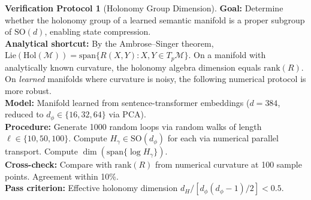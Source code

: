 \documentclass[11pt,a4paper]{article}
\theoremstyle{definition}
\newtheorem{protocol}[theorem]{Verification Protocol}
\theoremstyle{remark}
\newcommand{\SO}{\mathrm{SO}}
\newcommand{\Hol}{\mathrm{Hol}}
\begin{document}
\begin{protocol}[Holonomy Group Dimension]\label{prot:holonomy_dim}
\textbf{Goal:} Determine whether the holonomy group of a learned 
semantic manifold is a proper subgroup of $\SO(d)$, enabling 
state compression. \\
\textbf{Analytical shortcut:} By the Ambrose--Singer theorem, 
$\mathrm{Lie}(\Hol(\mathcal{M})) = \mathrm{span}\{R(X,Y) : 
X, Y \in T_p\mathcal{M}\}$. On a manifold with analytically 
known curvature, the holonomy algebra dimension equals 
$\mathrm{rank}(R)$. On \emph{learned} manifolds where curvature 
is noisy, the following numerical protocol is more robust. \\
\textbf{Model:} Manifold learned from sentence-transformer 
embeddings ($d = 384$, reduced to $d_\phi \in \{16, 32, 64\}$ 
via PCA). \\
\textbf{Procedure:} Generate 1000 random loops via random walks 
of length $\ell \in \{10, 50, 100\}$. Compute 
$H_\gamma \in \SO(d_\phi)$ for each via numerical parallel 
transport. Compute 
$\dim(\mathrm{span}\{\log H_\gamma\})$. \\
\textbf{Cross-check:} Compare with $\mathrm{rank}(R)$ from 
numerical curvature at 100 sample points. Agreement within 10\%. \\
\textbf{Pass criterion:} Effective holonomy dimension 
$d_H / [d_\phi(d_\phi-1)/2] < 0.5$.
\end{protocol}

\end{document}
